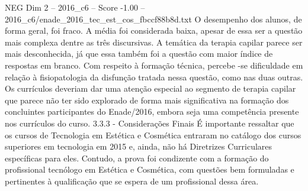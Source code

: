 \begin{textsample}{NEG Dim 2 – 2016\_c6 – Score -1.00 – 2016\_c6/enade\_2016\_tec\_est\_cos\_fbccf88b8d.txt}
O desempenho dos alunos, de forma geral, foi fraco.
A média foi considerada baixa, apesar de essa ser a questão mais complexa dentre as três discursivas.
A temática da terapia capilar parece ser mais desconhecida, já que essa também foi a questão com maior índice de respostas em branco.
Com respeito à formação técnica, percebe -se dificuldade em relação à fisiopatologia da disfunção tratada nessa questão, como nas duas outras.
Os currículos deveriam dar uma atenção especial ao segmento de terapia capilar que parece não ter sido explorado de forma mais significativa na formação dos concluintes participantes do Enade/2016, embora seja uma competência presente nos currículos do curso. 3.3.3 - Considerações Finais É importante ressaltar que os cursos de Tecnologia em Estética e Cosmética entraram no catálogo dos cursos superiores em tecnologia em 2015 e, ainda, não há Diretrizes Curriculares específicas para eles.
Contudo, a prova foi condizente com a formação do profissional tecnólogo em Estética e Cosmética, com questões bem formuladas e pertinentes à qualificação que se espera de um profissional dessa área.

\end{textsample}
